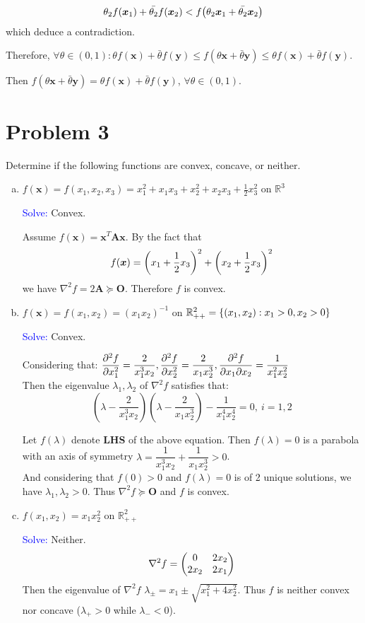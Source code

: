 \documentclass{article}
\def\RR{\mathbb{R}}
\def\bx{\boldsymbol{x}}
\def\by{\boldsymbol{y}}
\def\bA{\boldsymbol{A}}
\def\bO{\boldsymbol{O}}
\def\convex#1#2{\theta#1+\bar{\theta}#2}
\def\Esolve{\textcolor{blue}{Solve: }}
\begin{document}
$$
\theta_2f(\bx_1)+\bar{\theta_2}f(\bx_2)<f\qty(\theta_2\bx_1+\bar{\theta_2}\bx_2)
$$
which deduce a contradiction.

Therefore, $\forall\theta\in(0,1):\convex{f(\bx)}{f(\by)}\le f(\convex{\bx}{\by})\le\convex{f(\bx)}{f(\by)}$.

Then $f(\convex{\bx}{\by})=\convex{f(\bx)}{f(\by)}$, $\forall \theta\in(0,1)$.


\newpage

\section*{Problem 3}
Determine if the following functions are convex, concave, or neither.

\begin{enumerate}[(a)]
	\item $f(\bx)=f(x_1,x_2,x_3)=x_1^2+x_1x_3+x_2^2+x_2x_3+\frac12x_3^2$ on $\RR^3$
		
		\Esolve Convex.

		Assume $f(\bx)=\bx^T\bA\bx$. By the fact that
		$$
		f(\bx)=\qty(x_1+\frac12x_3)^2+\qty(x_2+\frac12x_3)^2
		$$
		we have $\nabla^2f=2\bA\succeq\bO$. Therefore $f$ is convex.

	\item $f(\bx)=f(x_1,x_2)=(x_1x_2)^{-1}$ on $\RR_{++}^2=\qty{(x_1,x_2):x_1>0,x_2>0}$

		\Esolve Convex.

		Considering that:
		$\displaystyle{
			\pdv[2]{f}{x_1}=\dfrac{2}{x_1^3x_2},
			\pdv[2]{f}{x_2}=\dfrac{2}{x_1x_2^3},
			\pdv{f}{x_1}{x_2}=\dfrac{1}{x_1^2x_2^2}
		}$\\

		Then the eigenvalue $\lambda_1,\lambda_2$ of $\nabla^2f$ satisfies that: 
		$$
		(\lambda-\dfrac{2}{x_1^3x_2})(\lambda-\dfrac{2}{x_1x_2^3})-\dfrac{1}{x_1^4x_2^4}=0,\ i=1,2
		$$

		Let $f(\lambda)$ denote \textbf{LHS} of the above equation. Then $f(\lambda)=0$ is a parabola with an axis of symmetry $\lambda=\dfrac{1}{x_1^3x_2}+\dfrac{1}{x_1x_2^3}>0$.\\

		And considering that $f(0)>0$ and $f(\lambda)=0$ is of 2 unique solutions, we have $\lambda_1,\lambda_2>0$. Thus $\nabla^2f\succeq\bO$ and $f$ is convex.
	\item
		$f(x_1,x_2)=x_1x_2^2$ on $\RR_{++}^2$

		\Esolve Neither.
		$$\nabla^2f=\mqty(0 & 2x_2 \\ 2x_2 & 2x_1)$$
		Then the eigenvalue of $\nabla^2f$ $\lambda_{\pm}=x_1\pm\sqrt{x_1^2+4x_2^2}$. Thus $f$ is neither convex nor concave ($\lambda_+>0$ while $\lambda_-<0$).


\end{enumerate}
\end{document}
